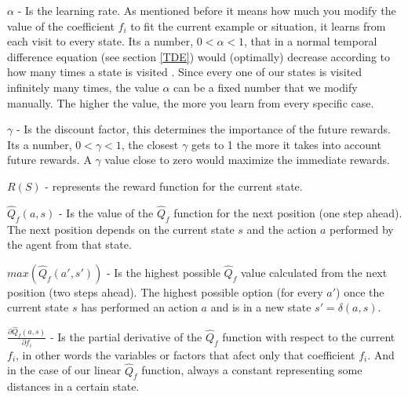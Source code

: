 \begin{flushleft}
$\alpha$  - Is the learning rate. As mentioned before it means how much you modify the value of the coefficient $f_i$ to fit the current example or situation, it learns from each visit to every state. Its a number, $0 < \alpha < 1$, that in a normal temporal difference equation (see section \ref{TDE}) would (optimally) decrease according to how many times a state is visited \cite{rl}. Since every one of our states is visited infinitely many times, the value $\alpha$ can be a fixed number that we modify manually. The higher the value, the more you learn from every specific case.
\end{flushleft} 

\begin{flushleft}
$\gamma$  - Is the discount factor, this determines the importance of the future rewards. Its a number, $0 < \gamma < 1$, the closest $\gamma$ gets to 1 the more it takes into account future rewards. A $\gamma$ value close to zero would maximize the immediate rewards. 
\end{flushleft} 

\begin{flushleft}
$R(S)$ -  represents the reward function for the current state.
\end{flushleft} 

\begin{flushleft}
$\hat{Q}_f(a,s)$ - Is the value of the $\hat{Q}_f$ function for the next position (one step ahead). The next position depends on the current state $s$ and the action $a$ performed by the agent from that state.
\end{flushleft} 

\begin{flushleft}
$max(\hat{Q}_f(a',s'))$ - Is the highest possible $\hat{Q}_f$ value calculated from the next position (two steps ahead). The highest possible option (for every $a'$) once the current state $s$ has performed an action $a$ and is in a new state $s' = \delta(a,s)$. 
\end{flushleft} 

\begin{flushleft}
$\frac{\partial \hat{Q}_f(a,s)}{\partial f_i}$  - Is the partial derivative of the $\hat{Q}_f$ function with respect to the current $f_i$, in other words the variables or factors that afect only that coefficient $f_i$. And in the case of our  linear $\hat{Q}_f$ function, always a constant representing some distances in a certain state. 
\end{flushleft} 

